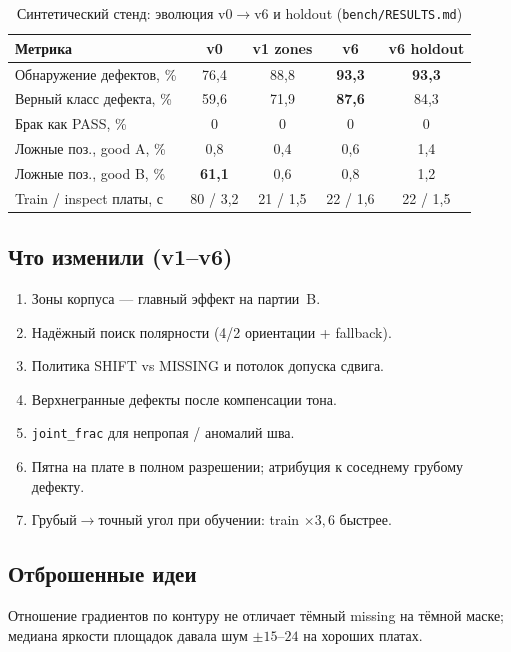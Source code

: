 \documentclass[12pt,a4paper]{article}
\begin{document}
\begin{table}[H]
\centering
\caption{Синтетический стенд: эволюция v0\(\to\)v6 и holdout
(\texttt{bench/RESULTS.md})}
\label{tab:v6}
\begin{tabular}{@{}lcccc@{}}
\toprule
Метрика & v0 & v1 zones & \textbf{v6} & v6 holdout \\
\midrule
Обнаружение дефектов, \%
  & 76{,}4 & 88{,}8 & \textbf{93{,}3} & \textbf{93{,}3} \\
Верный класс дефекта, \%
  & 59{,}6 & 71{,}9 & \textbf{87{,}6} & 84{,}3 \\
Брак как PASS, \%
  & 0 & 0 & 0 & 0 \\
Ложные поз., good A, \%
  & 0{,}8 & 0{,}4 & 0{,}6 & 1{,}4 \\
Ложные поз., good B, \%
  & \textbf{61{,}1} & 0{,}6 & 0{,}8 & 1{,}2 \\
Train / inspect платы, с
  & 80 / 3{,}2 & 21 / 1{,}5 & 22 / 1{,}6 & 22 / 1{,}5 \\
\bottomrule
\end{tabular}
\end{table}

\subsection{Что изменили (v1--v6)}
\begin{enumerate}[leftmargin=1.5em,itemsep=0.15em]
  \item Зоны корпуса --- главный эффект на партии~B.
  \item Надёжный поиск полярности (4/2 ориентации + fallback).
  \item Политика SHIFT vs MISSING и потолок допуска сдвига.
  \item Верхнегранные дефекты после компенсации тона.
  \item \texttt{joint\_frac} для непропая / аномалий шва.
  \item Пятна на плате в полном разрешении; атрибуция к соседнему грубому
        дефекту.
  \item Грубый\(\to\)точный угол при обучении: train \(\times 3{,}6\) быстрее.
\end{enumerate}

\subsection{Отброшенные идеи}
Отношение градиентов по контуру не отличает тёмный missing на тёмной маске;
медиана яркости площадок давала шум \(\pm 15\)--\(24\) на хороших платах.
\end{document}
